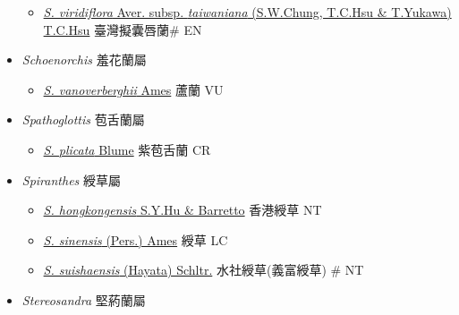 \begin{itemize}
  \begin{itemize}
        \item[] \href{http://www.theplantlist.org/tpl1.1/search?q=Saccolabiopsis+viridiflora+subsp.+taiwaniana}{\textit{S. viridiflora} Aver. subsp. \textit{taiwaniana} (S.W.Chung, T.C.Hsu \& T.Yukawa) T.C.Hsu}   臺灣擬囊唇蘭\# EN
  \end{itemize}
 \item[] \textit{Schoenorchis} 羞花蘭屬
                    
  \begin{itemize}
        \item[] \href{http://www.theplantlist.org/tpl1.1/search?q=Schoenorchis+vanoverberghii}{\textit{S. vanoverberghii} Ames}   蘆蘭 VU
  \end{itemize}
 \item[] \textit{Spathoglottis} 苞舌蘭屬
                    
  \begin{itemize}
        \item[] \href{http://www.theplantlist.org/tpl1.1/search?q=Spathoglottis+plicata}{\textit{S. plicata} Blume}   紫苞舌蘭 CR
  \end{itemize}
 \item[] \textit{Spiranthes} 綬草屬
                    
  \begin{itemize}
        \item[] \href{http://www.theplantlist.org/tpl1.1/search?q=Spiranthes+hongkongensis}{\textit{S. hongkongensis} S.Y.Hu \& Barretto}   香港綬草 NT
        \item[] \href{http://www.theplantlist.org/tpl1.1/search?q=Spiranthes+sinensis}{\textit{S. sinensis} (Pers.) Ames}   綬草 LC
        \item[] \href{http://www.theplantlist.org/tpl1.1/search?q=Spiranthes+suishaensis}{\textit{S. suishaensis} (Hayata) Schltr.}     水社綬草(義富綬草)  \# NT
  \end{itemize}
 \item[] \textit{Stereosandra} 堅葯蘭屬
                    

\end{itemize}
